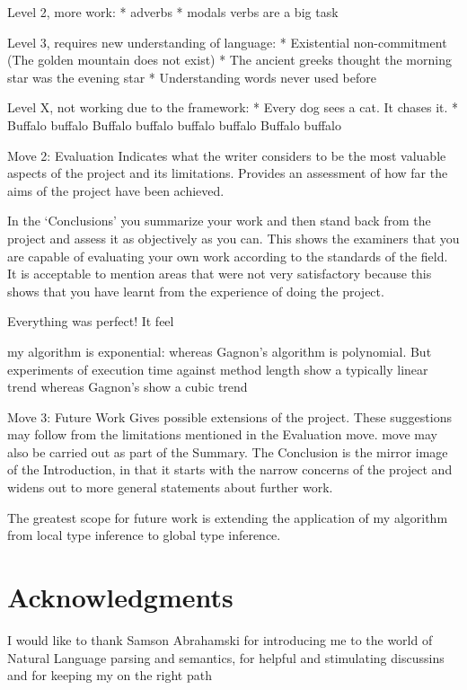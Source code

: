 \documentclass[12pt]{article}
\let\stdsection\section
\renewcommand\section{\newpage\stdsection}
\begin{document}
Level 2, more work:
* adverbs
* modals verbs are a big task

Level 3, requires new understanding of language:
* Existential non-commitment (The golden mountain does not exist)
* The ancient greeks thought the morning star was the evening star
* Understanding words never used before

Level X, not working due to the framework:
* Every dog sees a cat. It chases it.
* Buffalo buffalo Buffalo buffalo buffalo buffalo Buffalo buffalo



Move 2: Evaluation
Indicates what the writer considers to be the most valuable aspects of the project and its limitations. Provides 
an assessment of how far the aims of the project have been achieved.

In the ‘Conclusions’ you summarize your work and then stand back from the project and assess it as  objectively as you can. This shows the examiners that you are capable of evaluating your own work according to the standards of the field. It is acceptable to mention areas that were not very satisfactory because this shows that you have learnt from the experience of doing the project.

Everything was perfect!
It feel

my algorithm is exponential: whereas Gagnon's algorithm is 
polynomial. But experiments of execution time against method length show a typically linear trend whereas 
Gagnon's show a cubic trend



Move 3: Future Work
Gives possible extensions of the project. These suggestions may follow from the limitations mentioned in the 
Evaluation move.
move may also be carried out as part of the Summary. The Conclusion is the mirror image of the 
Introduction, in that it starts with the narrow concerns of the project and widens out to more general 
statements about further work.


The greatest scope for future work is extending the application of my algorithm from local type inference to global type inference.





\section{Acknowledgments}
I would like to thank Samson Abrahamski for introducing me to the world of Natural Language parsing and semantics, for helpful and stimulating discussins and for keeping my on the right path
\end{document}
